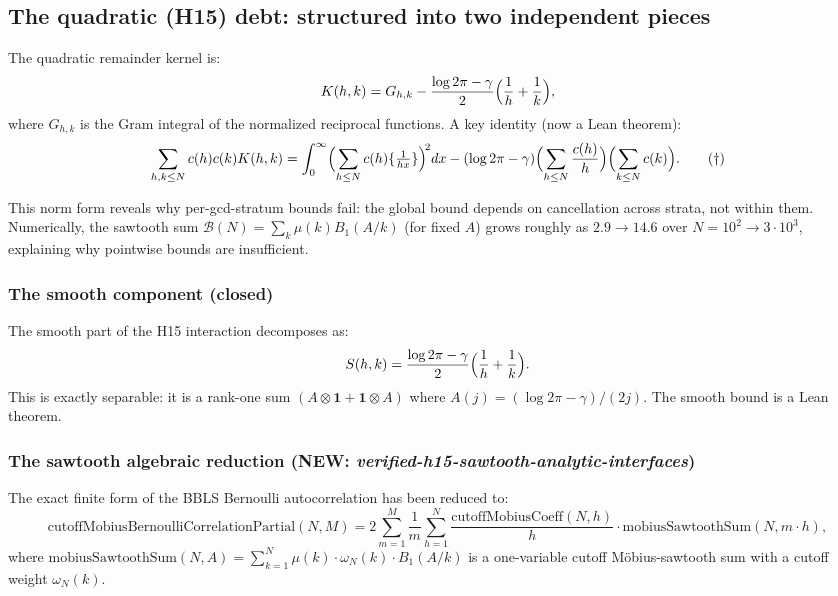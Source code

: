 \documentclass[11pt,a4paper]{article}
\newcommand{\fract}[1]{\{#1\}}
\begin{document}
\subsection{The quadratic (H15) debt: structured into two independent pieces}

\label{sec:quad}

The quadratic remainder kernel is:
\[
K(h,k)=G_{h,k}-\frac{\log2\pi-\gamma}{2}\Bigl(\frac1h+\frac1k\Bigr),
\]
where $G_{h,k}$ is the Gram integral of the normalized reciprocal functions. A key identity (now a Lean theorem):
\[
\sum_{h,k\le N}c(h)c(k)K(h,k)
=\int_0^\infty\Bigl(\sum_{h\le N}c(h)\fract{\tfrac1{hx}}\Bigr)^{\!2}dx
-(\log2\pi-\gamma)\Bigl(\sum_{h\le N}\frac{c(h)}{h}\Bigr)\Bigl(\sum_{k\le N}c(k)\Bigr).
\tag{$\dagger$}
\]

This norm form reveals why per-gcd-stratum bounds fail: the global bound depends on cancellation across strata, not within them. Numerically, the sawtooth sum $\mathcal B(N)=\sum_k \mu(k) B_1(A/k)$ (for fixed $A$) grows roughly as $2.9 \to 14.6$ over $N=10^2 \to 3 \cdot 10^3$, explaining why pointwise bounds are insufficient.

\subsubsection{The smooth component (closed)}

The smooth part of the H15 interaction decomposes as:
\[
S(h,k) = \frac{\log 2\pi - \gamma}{2}\Bigl(\frac{1}{h} + \frac{1}{k}\Bigr).
\]
This is exactly separable: it is a rank-one sum $(A \otimes \mathbf{1} + \mathbf{1} \otimes A)$ where $A(j)=(\log 2\pi - \gamma)/(2j)$. The smooth bound is a Lean theorem.

\subsubsection{The sawtooth algebraic reduction (NEW: \textit{verified-h15-sawtooth-analytic-interfaces})}

The exact finite form of the BBLS Bernoulli autocorrelation has been reduced to:
\[
\text{cutoffMobiusBernoulliCorrelationPartial}(N, M)
= 2 \sum_{m=1}^{M} \frac{1}{m} \sum_{h=1}^{N}
\frac{\text{cutoffMobiusCoeff}(N,h)}{h} \cdot \text{mobiusSawtoothSum}(N, m \cdot h),
\]
where $\text{mobiusSawtoothSum}(N,A) = \sum_{k=1}^{N} \mu(k) \cdot \omega_N(k) \cdot B_1(A/k)$ is a one-variable cutoff Möbius-sawtooth sum with a cutoff weight $\omega_N(k)$.
\end{document}
